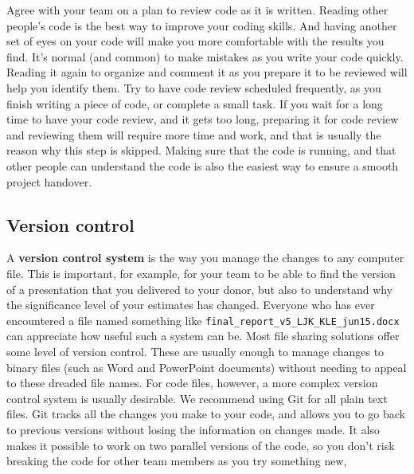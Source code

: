 Agree with your team on a plan to review code as it is written.
Reading other people's code is the best way to improve your coding skills.
And having another set of eyes on your code will make you more comfortable with the results you find.
It's normal (and common) to make mistakes as you write your code quickly.
Reading it again to organize and comment it as you prepare it to be reviewed will help you identify them.
Try to have code review scheduled frequently, as you finish writing a piece of code, or complete a small task.
If you wait for a long time to have your code review, and it gets too long,
preparing it for code review and reviewing them will require more time and work,
and that is usually the reason why this step is skipped.
Making sure that the code is running,
and that other people can understand the code is also the easiest way to ensure a smooth project handover.

\subsection{Version control}

A \textbf{version control system} is the way you manage the changes to any computer file.
This is important, for example, for your team to be able to find the version of a presentation that you delivered to your donor,
but also to understand why the significance level of your estimates has changed.
Everyone who has ever encountered a file named something like \texttt{final\_report\_v5\_LJK\_KLE\_jun15.docx}
can appreciate how useful such a system can be.
Most file sharing solutions offer some level of version control.
These are usually enough to manage changes to binary files (such as Word and PowerPoint documents) without needing to appeal to these dreaded file names.
For code files, however, a more complex version control system is usually desirable.
We recommend using Git for all plain text files.
Git tracks all the changes you make to your code,
and allows you to go back to previous versions without losing the information on changes made.
It also makes it possible to work on two parallel versions of the code,
so you don't risk breaking the code for other team members as you try something new,

